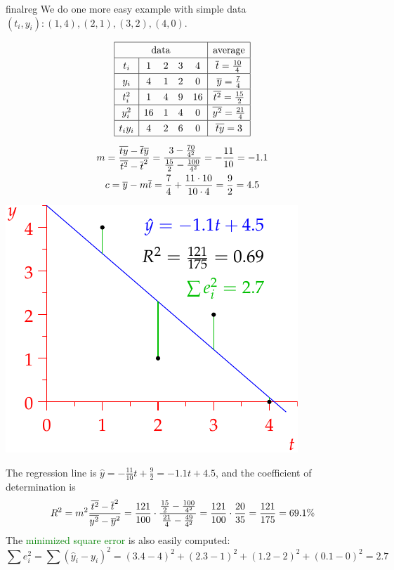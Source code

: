 \begin{example}{}{finalreg}
We do one more easy example with simple data $(t_i,y_i):(1,4),(2,1),(3,2),(4,0)$.\par
\begin{minipage}[t]{0.55\linewidth}\vspace{-10pt}
\begin{gather*}\renewcommand{\arraystretch}{1.3}
\begin{array}{|c|cccc|c|}
\hline
\multicolumn{5}{|c|}{\text{data}}&\text{average}\\\hline
t_i&1&2&3&4&\cl t=\frac{10}4\\\hline
y_i&4&1&2&0&\cl y=\frac 74\\\hline
t_i^2&1&4&9&16&\cl{t^2}=\frac{15}2\\\hline
y_i^2&16&1&4&0&\cl{y^2}=\frac{21}4\\\hline
t_iy_i&4&2&6&0&\cl{ty}=3\\\hline
\end{array}\\[5pt]
m=\frac{\cl{ty}-\cl t\cl y}{\cl{t^2}-\cl t^2} =\frac{3-\frac{70}{4^2}}{\frac{15}2-\frac{100}{4^2}} =-\frac{11}{10}=-1.1\\
c=\cl y-m\cl t=\frac{7}4+\frac{11\cdot 10}{10\cdot 4}=\frac 92 =4.5
\end{gather*}
\end{minipage}\begin{minipage}[t]{0.45\linewidth}\vspace{0pt}
\flushright\includegraphics{reg-line5}
\end{minipage}\medbreak
The regression line is $\hat y=-\frac{11}{10}t+\frac 92=-1.1t+4.5$, and the coefficient of determination is
\[R^2=m^2\frac{\overline{t^2}-\overline{t}^2}{\overline{y^2}-\overline{y}^2} =\frac{121}{100}\cdot \frac{\frac{15}2-\frac{100}{4^2}}{\frac{21}4-\frac{49}{4^2}}= \frac{121}{100}\cdot \frac{20}{35} =\frac{121}{175} =69.1\%\]
The \textcolor{Green}{minimized square error} is also easily computed:
\[\sum e_i^2=\sum(\hat y_i-y_i)^2=(3.4-4)^2+(2.3-1)^2+(1.2-2)^2+(0.1-0)^2=2.7\] 
\end{example}

